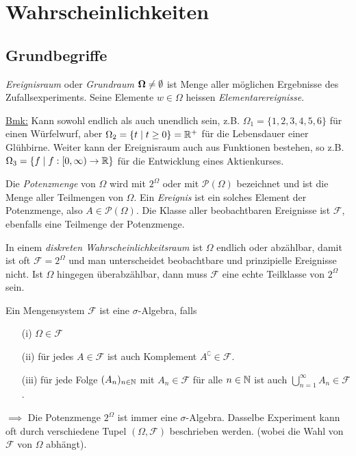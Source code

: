 \setcounter{section}{0} %

\section{Wahrscheinlichkeiten}
\subsection{Grundbegriffe}
\begin{definition}
\textit{Ereignisraum} oder \textit{Grundraum} $\boldsymbol{\Omega} \neq \emptyset$ ist Menge aller möglichen Ergebnisse des Zufallsexperiments. Seine Elemente $w\in \Omega$ heissen \textit{Elementarereignisse}.
\end{definition}
\underline{Bmk:} Kann sowohl endlich als auch unendlich sein, z.B. $\Omega_1 = \{1,2,3,4,5,6\}$ für einen Würfelwurf, aber $\Omega_2 = \{t \;|\; t \geq 0\} = \mathbb{R}^+$ für die Lebensdauer einer Glühbirne. Weiter kann der Ereignisraum auch aus Funktionen bestehen, so z.B. $\Omega_3 = \{f\;|\; f:[0,\infty)\to \mathbb{R}\}$ für die Entwicklung eines Aktienkurses. 

\begin{definition}
Die \textit{Potenzmenge} von $\Omega$ wird mit $2^\Omega$ oder mit $\mathcal{P}(\Omega)$ bezeichnet und ist die Menge aller Teilmengen von $\Omega$. Ein \textit{Ereignis} ist ein solches Element der Potenzmenge, also $A\in\mathcal{P}(\Omega)$. Die Klasse aller beobachtbaren Ereignisse ist $\mathcal{F}$, ebenfalls eine Teilmenge der Potenzmenge.
\end{definition}

In einem \textit{diskreten Wahrscheinlichkeitsraum} ist $\Omega$ endlich oder abzählbar, damit ist oft $\mathcal{F} = 2^\Omega$ und man unterscheidet beobachtbare und prinzipielle Ereignisse nicht. Ist $\Omega$ hingegen überabzählbar, dann muss $\mathcal{F}$ eine echte Teilklasse von $2^\Omega$ sein. 

\begin{definition}
Ein Mengensystem $\mathcal{F}$ ist eine $\sigma$-Algebra, falls
\begin{itemize}
\item[(i)] $\Omega \in \mathcal{F}$
\item[(ii)] für jedes $A\in\mathcal{F}$ ist auch Komplement $A^\complement \in \mathcal{F}$. 
\item[(iii)] für jede Folge $(A_n)_{n\in\mathbb{N}}$ mit $A_n \in \mathcal{F}$ für alle $n\in \mathbb{N}$ ist auch $\bigcup_{n=1}^\infty A_n \in \mathcal{F}$.
\end{itemize}
\end{definition}
$\implies$ Die Potenzmenge $2^\Omega$ ist immer eine $\sigma$-Algebra. Dasselbe Experiment kann oft durch verschiedene Tupel $(\Omega, \mathcal{F})$ beschrieben werden. (wobei die Wahl von $\mathcal{F}$ von $\Omega$ abhängt).

